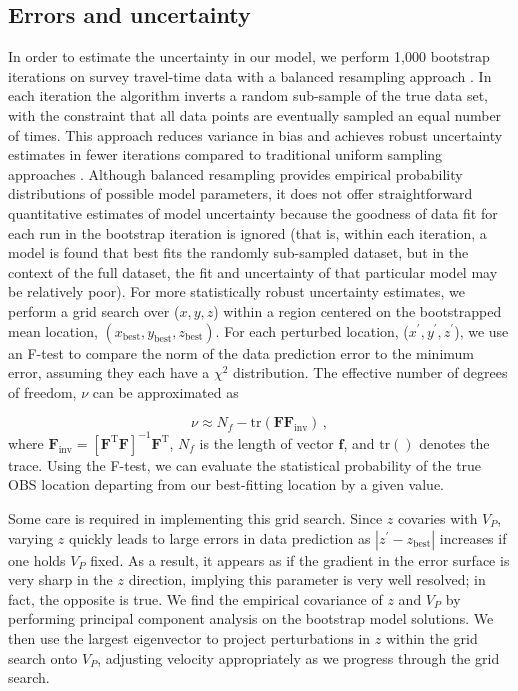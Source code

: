 \subsection{Errors and uncertainty}
In order to estimate the uncertainty in our model, we perform 1,000 bootstrap iterations on survey travel-time data with a balanced resampling approach \citep{Davison1986}. In each iteration the algorithm inverts a random sub-sample of the true data set, with the constraint that all data points are eventually sampled an equal number of times. This approach reduces variance in bias and achieves robust uncertainty estimates in fewer iterations compared to traditional uniform sampling approaches \citep{Hung2011}. Although balanced resampling provides empirical probability distributions of possible model parameters, it does not offer straightforward quantitative estimates of model uncertainty because the goodness of data fit for each run in the bootstrap iteration is ignored (that is, within each iteration, a model is found that best fits the randomly sub-sampled dataset, but in the context of the full dataset, the fit and uncertainty of that particular model may be relatively poor). For more statistically robust uncertainty estimates, we perform a grid search over ($x,y,z$) within a region centered on the bootstrapped mean location, 
$(x_{{\text{best}}},y_{{\text{best}}},z_{{\text{best}}})$. For each perturbed location, ($x^{\prime},y^{\prime},z^{\prime}$), we use an F-test to compare the norm of the data prediction error to the minimum error, assuming they each have a $\chi^2$ distribution. The effective number of degrees of freedom, $\nu$ can be approximated as 

\begin{equation}
\nu \approx N_f - \text{tr}(\mathbf{F}\mathbf{F}_{\text{inv}}) \,,
\end{equation}
where $\mathbf{F}_{\text{inv}}= \left[ \mathbf{F}^{\text{T}} \mathbf{F} \right]^{-1} \mathbf{F}^{\text{T}}$, $N_f$ is the length of vector $\mathbf{f}$, and $\text{tr}()$ denotes the trace. Using the F-test, we can evaluate the statistical probability of the true OBS location departing from our best-fitting location by a given value. 

Some care is required in implementing this grid search. Since $z$ covaries with $V_P$, varying $z$ quickly leads to large errors in data prediction as $|z^{\prime}-z_{{\text{best}}}|$ increases if one holds $V_P$ fixed. As a result, it appears as if the gradient in the error surface is very sharp in the $z$ direction, implying this parameter is very well resolved; in fact, the opposite is true. We find the empirical covariance of $z$ and $V_P$ by performing principal component analysis on the bootstrap model solutions. We then use the largest eigenvector to project perturbations in $z$ within the grid search onto $V_P$, adjusting velocity appropriately as we progress through the grid search. 

